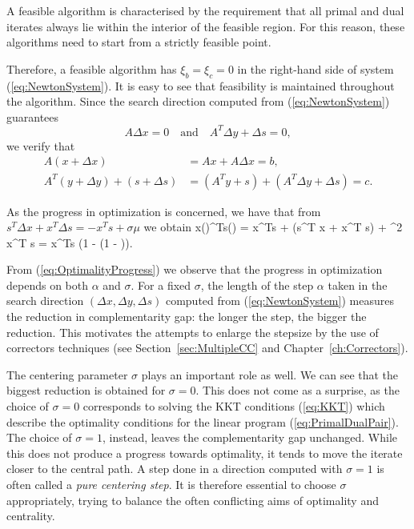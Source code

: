 A feasible algorithm is characterised by the requirement that
all primal and dual iterates always lie within the interior 
of the feasible region. For this reason, these algorithms 
need to start from a strictly feasible point. 

Therefore, a feasible algorithm has $\xi_b = \xi_c = 0$
in the right-hand side of system (\ref{eq:NewtonSystem}). 
It is easy to see that feasibility
is maintained throughout the algorithm. Since
the search direction computed from (\ref{eq:NewtonSystem})
guarantees
\[
  A \Delta x = 0 \quad \text{and} \quad
  A^T \Delta y + \Delta s = 0,
\]
we verify that
\[
  \begin{split}
  A (x + \Delta x) &= Ax + A\Delta x = b, \\
  A^T(y +\Delta y) + (s +\Delta s) &= (A^T y +s) + (A^T\Delta y +\Delta s) = c.
  \end{split}
\]

As the progress in optimization is concerned,
we have that from $s^T \Delta x + x^T \Delta s = -x^Ts + \sigma\mu$
we obtain
\be  \label{eq:OptimalityProgress}
   x(\alpha)^Ts(\alpha) = x^Ts + \alpha(s^T \Delta x + x^T \Delta s)
     + \alpha^2 \Delta x^T \Delta s = x^Ts (1 - \alpha (1 - \sigma)).
\ee

From (\ref{eq:OptimalityProgress}) we observe that the progress in
optimization depends on both $\alpha$ and $\sigma$.
For a fixed $\sigma$, the length of the step $\alpha$ taken in 
the search direction
$(\Delta x,\Delta y ,\Delta s)$ computed from (\ref{eq:NewtonSystem})
measures the reduction in complementarity gap: 
the longer the step, the bigger the reduction. This motivates
the attempts to enlarge the stepsize by the use of correctors
techniques (see Section~\ref{sec:MultipleCC} and Chapter~\ref{ch:Correctors}).

The centering parameter $\sigma$ plays an important role as well.
We can see that the biggest reduction is obtained for $\sigma = 0$.
This does not come as a surprise, as the choice of $\sigma = 0$
corresponds to solving the KKT conditions (\ref{eq:KKT}) which
describe the optimality conditions for the linear program
(\ref{eq:PrimalDualPair}). The choice of $\sigma = 1$, instead,
leaves the complementarity gap unchanged. While this does not
produce a progress towards optimality, it tends to move the iterate
closer to the central path. A step done in a direction computed
with $\sigma = 1$ is often called a {\em pure centering step}.
It is therefore essential to choose $\sigma$ appropriately, trying
to balance the often conflicting aims of optimality and centrality.

